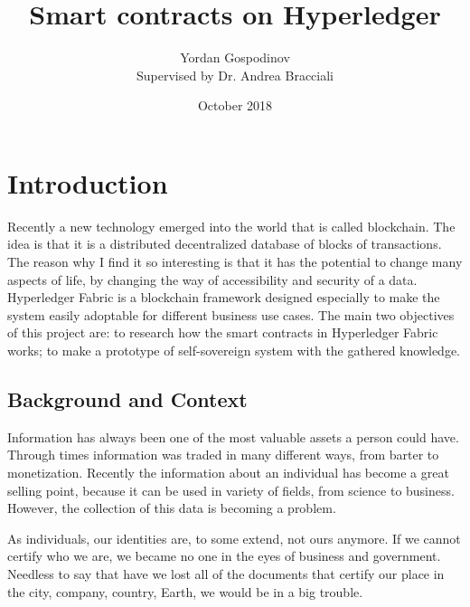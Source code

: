 \documentclass[a4paper,11pt]{report}
\title{Smart contracts on Hyperledger}			%
\author{
{Yordan Gospodinov} \\
{\small{Supervised by Dr. Andrea Bracciali}}
}			%
\date{October 2018}			%
\begin{document}
\maketitle				%


\tableofcontents
\thispagestyle{empty}
\clearpage

\setcounter{page}{1}

\chapter{Introduction}

\label{introduction}

Recently a new technology emerged into the world that is called blockchain. The idea is that it is a distributed decentralized database of blocks of transactions. The reason why I find it so interesting is that it has the potential to change many aspects of life, by changing the way of accessibility and security of a data. Hyperledger Fabric is a blockchain framework designed especially to make the system easily adoptable for different business use cases. The main two objectives of this project are: to research how the smart contracts in Hyperledger Fabric works; to make a prototype of self-sovereign system with the gathered knowledge. 


\section{Background and Context}

\label{introduction-background}

Information has always been one of the most valuable assets a person could have. Through times information was traded in many different ways, from barter to monetization. Recently the information about an individual has become a great selling point, because it can be used in variety of fields, from science to business. However, the collection of this data is becoming a problem.

	As individuals, our identities are, to some extend, not ours anymore. If we cannot certify who we are, we became no one in the eyes of business and government. Needless to say that have we lost all of the documents that certify our place in the city, company, country, Earth, we would be in a big trouble. \cite{allen2016path}
	
\end{document}
